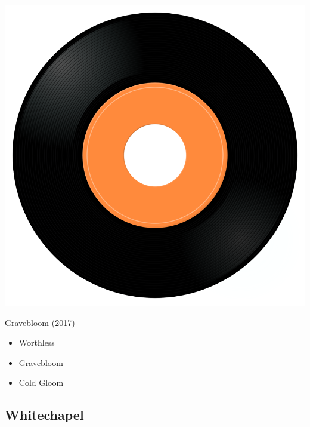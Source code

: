 \begin{minipage}[t]{0.25\textwidth}\vspace{0pt}
\captionsetup{type=figure}
\includegraphics[width=\textwidth]{Images/cover.png}
\caption*{Gravebloom (2017)}
\end{minipage}
\begin{minipage}[t]{0.25\textwidth}\vspace{0pt}
\begin{itemize}[nosep,leftmargin=1em,labelwidth=*,align=left]
	\setlength{\itemsep}{0pt}
	\item Worthless
	\item Gravebloom
	\item Cold Gloom
\end{itemize}
\end{minipage}

\subsection{Whitechapel}

